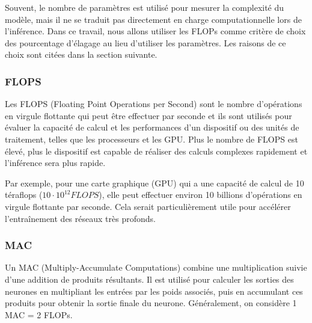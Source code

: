 Souvent, le nombre de paramètres est utilisé pour mesurer la complexité du modèle, mais il ne se traduit pas directement en charge computationnelle lors de l'inférence. Dans ce travail, nous allons utiliser les FLOPs comme critère de choix des pourcentage d’élagage au lieu d'utiliser les paramètres. Les raisons de ce choix sont citées dans la section suivante.

\subsubsection{FLOPS}
Les FLOPS (Floating Point Operations per Second) sont le nombre d'opérations en virgule flottante qui peut être effectuer par seconde et ils sont utilisés pour évaluer la capacité de calcul et les performances d'un dispositif ou des unités de traitement, telles que les processeurs et les GPU. Plus le nombre de FLOPS est élevé, plus le dispositif est capable de réaliser des calculs complexes rapidement et l’inférence sera plus rapide.

Par exemple, pour une carte graphique (GPU) qui a une capacité de calcul de 10 téraflops ($10 \cdot 10^{12} FLOPS$), elle peut effectuer environ 10 billions d'opérations en virgule flottante par seconde. Cela serait particulièrement utile pour accélérer l'entraînement des réseaux très profonds.

\subsubsection{MAC}
Un MAC (Multiply-Accumulate Computations) combine une multiplication suivie d'une addition de produits résultants. Il est utilisé pour calculer les sorties des neurones en multipliant les entrées par les poids associés, puis en accumulant ces produits pour obtenir la sortie finale du neurone. Généralement, on considère 1 MAC = 2 FLOPs.

